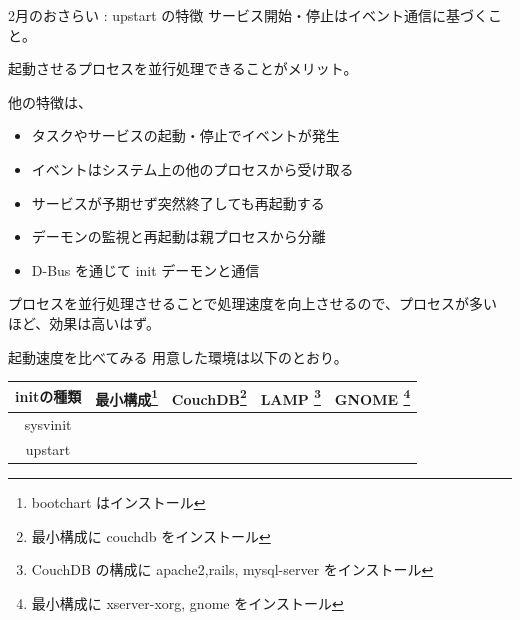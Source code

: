 \begin{frame}{2月のおさらい : upstart の特徴}
サービス開始・停止はイベント通信に基づくこと。

起動させるプロセスを並行処理できることがメリット。

他の特徴は、
\begin{itemize}
 \item タスクやサービスの起動・停止でイベントが発生
 \item イベントはシステム上の他のプロセスから受け取る
 \item サービスが予期せず突然終了しても再起動する
 \item デーモンの監視と再起動は親プロセスから分離
 \item D-Bus を通じて init デーモンと通信
\end{itemize}

 プロセスを並行処理させることで処理速度を向上させるので、プロセスが多い
 ほど、効果は高いはず。
\end{frame}

\begin{frame}{起動速度を比べてみる}
 用意した環境は以下のとおり。

\begin{table}
\begin{tabular}[h]{|c|c|c|c|c|}\hline
initの種類 & 最小構成\footnote{bootchart はインストール} & CouchDB\footnote{最小構成に couchdb をインストール} & LAMP \footnote{CouchDB の構成に apache2,rails, mysql-server をインストール} & GNOME \footnote{最小構成に xserver-xorg, gnome をインストール} \\
\hline\hline
sysvinit & & & & \\
\hline
upstart & & & & \\
\hline
\end{tabular}
\end{table}
\end{frame}


